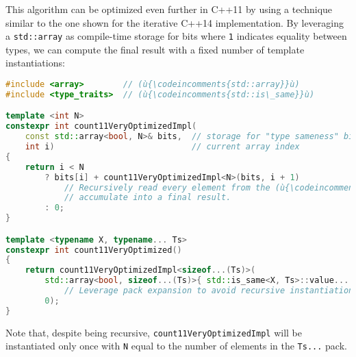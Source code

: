 \noindent This algorithm can be optimized even further in C++11 by using
a technique similar to the one shown for the iterative C++14
implementation. By leveraging a \texttt{std::array} as compile-time
storage for bits where \texttt{1} indicates equality between types, we can compute the final result with a fixed number of template
instantiations:

\begin{lstlisting}[language=C++]
#include <array>        // (ù{\codeincomments{std::array}}ù)
#include <type_traits>  // (ù{\codeincomments{std::is\_same}}ù)

template <int N>
constexpr int count11VeryOptimizedImpl(
    const std::array<bool, N>& bits,  // storage for "type sameness" bits
    int i)                            // current array index
{
    return i < N
        ? bits[i] + count11VeryOptimizedImpl<N>(bits, i + 1)
            // Recursively read every element from the (ù{\codeincomments{bits}}ù) array and
            // accumulate into a final result.
        : 0;
}

template <typename X, typename... Ts>
constexpr int count11VeryOptimized()
{
    return count11VeryOptimizedImpl<sizeof...(Ts)>(
        std::array<bool, sizeof...(Ts)>{ std::is_same<X, Ts>::value... },
            // Leverage pack expansion to avoid recursive instantiations.
        0);
}
\end{lstlisting}
    
\noindent Note that, despite being recursive, \texttt{count11VeryOptimizedImpl}
will be instantiated only once with \texttt{N} equal to the number of
elements in the \texttt{Ts...} pack.



